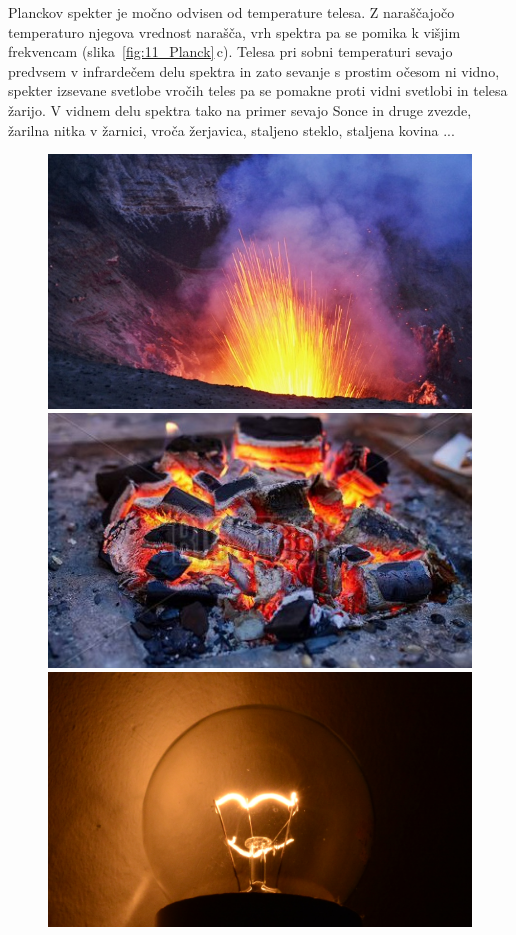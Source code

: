\begin{remark}
Planckov spekter je močno odvisen od temperature telesa. Z naraščajočo
temperaturo njegova vrednost narašča, vrh spektra pa se pomika k višjim
frekvencam (slika~\ref{fig:11_Planck}\,c). Telesa pri sobni temperaturi
sevajo predvsem v infrardečem delu spektra in zato sevanje s prostim očesom
ni vidno, spekter izsevane svetlobe vročih teles pa se pomakne proti
vidni svetlobi in telesa žarijo. V vidnem delu spektra tako na primer sevajo Sonce in 
druge zvezde, žarilna nitka v žarnici, vroča žerjavica, staljeno steklo, 
staljena kovina ...
\end{remark}
\begin{figure}[ht]
\centering
\includegraphics[width=7truecm]{slike/11_photo_vulkan.jpg}\hfill
\includegraphics[width=7truecm]{slike/BBR.jpg} \\ 
\includegraphics[width=7truecm]{slike/11_photo_zarnica.jpg}\hfill

\end{figure}
